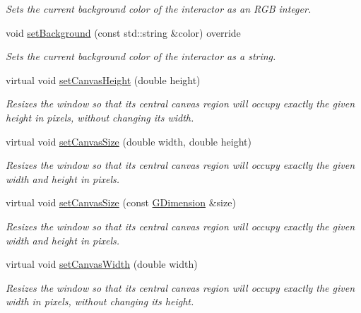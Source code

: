 \begin{DoxyCompactItemize}
\begin{DoxyCompactList}\small\item\em Sets the current background color of the interactor as an R\+GB integer. \end{DoxyCompactList}\item 
void \mbox{\hyperlink{classsgl_1_1GWindow_a9cb99695b93494c7ba28268ce9e42c2a}{set\+Background}} (const std\+::string \&color) override
\begin{DoxyCompactList}\small\item\em Sets the current background color of the interactor as a string. \end{DoxyCompactList}\item 
virtual void \mbox{\hyperlink{classsgl_1_1GWindow_a059f69fab57ad2cca2243c5a64f7306d}{set\+Canvas\+Height}} (double height)
\begin{DoxyCompactList}\small\item\em Resizes the window so that its central canvas region will occupy exactly the given height in pixels, without changing its width. \end{DoxyCompactList}\item 
virtual void \mbox{\hyperlink{classsgl_1_1GWindow_a06022723e253be88ca7e48034ff66244}{set\+Canvas\+Size}} (double width, double height)
\begin{DoxyCompactList}\small\item\em Resizes the window so that its central canvas region will occupy exactly the given width and height in pixels. \end{DoxyCompactList}\item 
virtual void \mbox{\hyperlink{classsgl_1_1GWindow_a22f0f065a223a3c0ae5173316ece1dc1}{set\+Canvas\+Size}} (const \mbox{\hyperlink{structsgl_1_1GDimension}{G\+Dimension}} \&size)
\begin{DoxyCompactList}\small\item\em Resizes the window so that its central canvas region will occupy exactly the given width and height in pixels. \end{DoxyCompactList}\item 
virtual void \mbox{\hyperlink{classsgl_1_1GWindow_a455beafcfc20a2b7d9ac00499e222f0f}{set\+Canvas\+Width}} (double width)
\begin{DoxyCompactList}\small\item\em Resizes the window so that its central canvas region will occupy exactly the given width in pixels, without changing its height. \end{DoxyCompactList}\item 

\end{DoxyCompactItemize}

